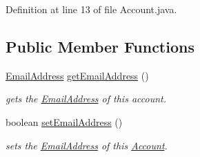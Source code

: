 Definition at line 13 of file Account.java.\subsection*{Public Member Functions}
\begin{CompactItemize}
\item 
\hyperlink{classEmailAddress}{EmailAddress} \hyperlink{classAccount_f8a1bb86591b5835fef9287aa4aca550}{getEmailAddress} ()
\begin{CompactList}\small\item\em gets the \hyperlink{classEmailAddress}{EmailAddress} of this account. \item\end{CompactList}\item 
boolean \hyperlink{classAccount_0286b42456e5fe6368467048dc020315}{setEmailAddress} ()
\begin{CompactList}\small\item\em sets the \hyperlink{classEmailAddress}{EmailAddress} of this \hyperlink{classAccount}{Account}. \item\end{CompactList}\end{CompactItemize}
